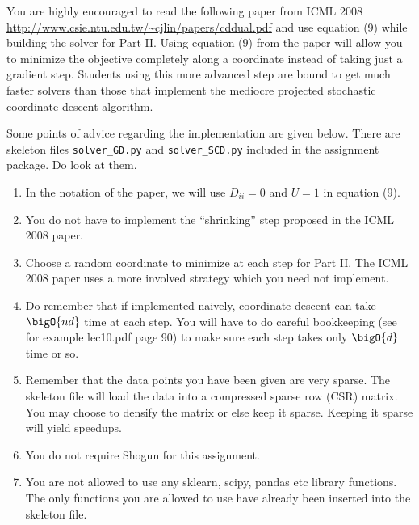 \documentclass[a4paper,11pt]{article}
\begin{document}
\begin{mlproblem}{40}
You are highly encouraged to read the following paper from ICML 2008 \url{http://www.csie.ntu.edu.tw/~cjlin/papers/cddual.pdf} and use equation (9) while building the solver for Part II. Using equation (9) from the paper will allow you to minimize the objective completely along a coordinate instead of taking just a gradient step. Students using this more advanced step are bound to get much faster solvers than those that implement the mediocre projected stochastic coordinate descent algorithm.

Some points of advice regarding the implementation are given below. There are skeleton files \verb|solver_GD.py| and \verb|solver_SCD.py| included in the assignment package. Do look at them.

\begin{enumerate}
	\item In the notation of the paper, we will use $D_{ii} = 0$ and $U = 1$ in equation (9).
	\item You do not have to implement the ``shrinking'' step proposed in the ICML 2008 paper.
	\item Choose a random coordinate to minimize at each step for Part II. The ICML 2008 paper uses a more involved strategy which you need not implement.
	\item Do remember that if implemented naively, coordinate descent can take $\bigO{nd}$ time at each step. You will have to do careful bookkeeping (see for example lec10.pdf page 90) to make sure each step takes only $\bigO{d}$ time or so.
	\item Remember that the data points you have been given are very sparse. The skeleton file will load the data into a compressed sparse row (CSR) matrix. You may choose to densify the matrix or else keep it sparse. Keeping it sparse will yield speedups.
	\item You do not require Shogun for this assignment.
	\item You are not allowed to use any sklearn, scipy, pandas etc library functions. The only functions you are allowed to use have already been inserted into the skeleton file.
\end{enumerate}

\end{mlproblem}
\end{document}

